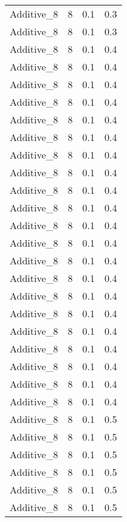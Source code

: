 \documentclass{article}
\begin{document}
\begin{longtable}[H]{lrrr}
 Additive\_8 &       8 &   0.1 &            0.3 \\
 Additive\_8 &       8 &   0.1 &            0.3 \\
 Additive\_8 &       8 &   0.1 &            0.4 \\
 Additive\_8 &       8 &   0.1 &            0.4 \\
 Additive\_8 &       8 &   0.1 &            0.4 \\
 Additive\_8 &       8 &   0.1 &            0.4 \\
 Additive\_8 &       8 &   0.1 &            0.4 \\
 Additive\_8 &       8 &   0.1 &            0.4 \\
 Additive\_8 &       8 &   0.1 &            0.4 \\
 Additive\_8 &       8 &   0.1 &            0.4 \\
 Additive\_8 &       8 &   0.1 &            0.4 \\
 Additive\_8 &       8 &   0.1 &            0.4 \\
 Additive\_8 &       8 &   0.1 &            0.4 \\
 Additive\_8 &       8 &   0.1 &            0.4 \\
 Additive\_8 &       8 &   0.1 &            0.4 \\
 Additive\_8 &       8 &   0.1 &            0.4 \\
 Additive\_8 &       8 &   0.1 &            0.4 \\
 Additive\_8 &       8 &   0.1 &            0.4 \\
 Additive\_8 &       8 &   0.1 &            0.4 \\
 Additive\_8 &       8 &   0.1 &            0.4 \\
 Additive\_8 &       8 &   0.1 &            0.4 \\
 Additive\_8 &       8 &   0.1 &            0.4 \\
 Additive\_8 &       8 &   0.1 &            0.4 \\
 Additive\_8 &       8 &   0.1 &            0.5 \\
 Additive\_8 &       8 &   0.1 &            0.5 \\
 Additive\_8 &       8 &   0.1 &            0.5 \\
 Additive\_8 &       8 &   0.1 &            0.5 \\
 Additive\_8 &       8 &   0.1 &            0.5 \\
 Additive\_8 &       8 &   0.1 &            0.5 \\

\end{longtable}
\end{document}
